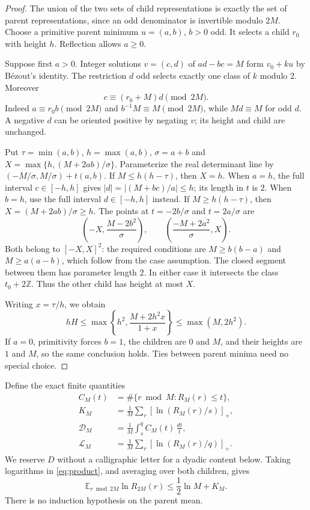 \documentclass[11pt,a4paper]{article}
\numberwithin{equation}{section}
\theoremstyle{remark}
\newcommand{\E}{\mathbb E}
\newcommand{\Z}{\mathbb Z}
\newcommand{\pos}[1]{\left[#1\right]_+}
\begin{document}
\begin{proof}
The union of the two sets of child representations is exactly the set of
parent representations, since an odd denominator is invertible modulo
$2M$. Choose a primitive parent minimum $u=(a,b)$, $b>0$ odd.
It selects a child $r_0$ with height $h$.
Reflection allows $a\ge0$.

Suppose first $a>0$. Integer solutions $v=(c,d)$ of
$ad-bc=M$ form $v_0+ku$ by B\'ezout's identity. The restriction $d$ odd
selects exactly one class of $k$ modulo $2$. Moreover
\[
 c\equiv(r_0+M)d\pmod{2M}.
\]
Indeed $a\equiv r_0b\pmod{2M}$ and $b^{-1}M\equiv M\pmod{2M}$,
while $Md\equiv M$ for odd $d$. A negative $d$ can be oriented positive
by negating $v$; its height and child are unchanged.

Put $\tau=\min(a,b)$, $h=\max(a,b)$, $\sigma=a+b$ and
$X=\max\{h,(M+2ab)/\sigma\}$.
Parameterize the real determinant line by
$(-M/\sigma,M/\sigma)+t(a,b)$.
If $M\le h(h-\tau)$, then $X=h$. When $a=h$, the full interval
$c\in[-h,h]$ gives $|d|=|(M+bc)/a|\le h$; its length in $t$ is $2$.
When $b=h$, use the full interval $d\in[-h,h]$ instead.
If $M\ge h(h-\tau)$, then $X=(M+2ab)/\sigma\ge h$. The points at
$t=-2b/\sigma$ and $t=2a/\sigma$ are
\[
 \left(-X,\frac{M-2b^2}{\sigma}\right),\qquad
 \left(\frac{-M+2a^2}{\sigma},X\right).
\]
Both belong to $[-X,X]^2$: the required conditions are
$M\ge b(b-a)$ and $M\ge a(a-b)$, which follow from the case assumption.
The closed segment between them has parameter length $2$.
In either case it intersects the class $t_0+2\Z$.
Thus the other child has height at most $X$.

Writing $x=\tau/h$, we obtain
\[
 hH\le\max\left\{h^2,\frac{M+2h^2x}{1+x}\right\}
       \le\max(M,2h^2).
\]
If $a=0$, primitivity forces $b=1$, the children are $0$ and $M$, and
their heights are $1$ and $M$, so the same conclusion holds.
Ties between parent minima need no special choice.
\end{proof}

Define the exact finite quantities
\begin{equation}\label{eq:budgets}
\begin{split}
 C_M(t)&=\#\{r\bmod M:R_M(r)\le t\},\\
 K_M&=\frac1M\sum_r\pos{\ln(R_M(r)/s)},\\
 \mathcal D_M&=\frac1M\int_s^q C_M(t)\,\frac{dt}{t},\\
 \mathcal L_M&=\frac1M\sum_r\pos{\ln(R_M(r)/q)}.
\end{split}
\end{equation}
We reserve $D$ without a calligraphic letter for a dyadic content below.
Taking logarithms in \eqref{eq:product}, and averaging over both children,
gives
\begin{equation}\label{eq:reduction}
 \E_{r\bmod2M}\ln R_{2M}(r)\le \frac12\ln M+K_M.
\end{equation}
There is no induction hypothesis on the parent mean.
\end{document}
